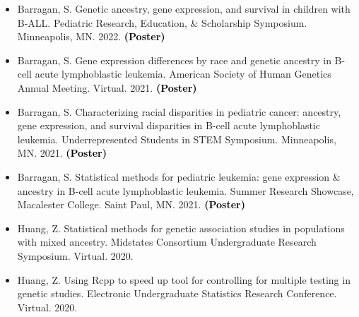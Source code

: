 \documentclass[margin]{res}
\newcommand{\annotate}[1]{\textcolor{black}{\textbf{(#1)}}}
\begin{document}
\begin{resume}
\begin{itemize}


\item[7.] Barragan, S.  
Genetic ancestry, gene expression, and survival in children with B-ALL. 
Pediatric Research, Education, \& Scholarship Symposium. Minneapolis, MN. 2022. 
\annotate{Poster}


\item[6.] Barragan, S.  
Gene expression differences by race and genetic ancestry in B-cell acute lymphoblastic leukemia. 
American Society of Human Genetics Annual Meeting. Virtual. 2021. 
\annotate{Poster}

\item[5.] Barragan, S.  
Characterizing racial disparities in pediatric cancer: ancestry, gene expression, and survival disparities in B-cell acute lymphoblastic leukemia. 
Underrepresented Students in STEM Symposium. Minneapolis, MN. 2021. 
\annotate{Poster}

\item[4.] Barragan, S.  
Statistical methods for pediatric leukemia: gene expression \& ancestry in B-cell acute lymphoblastic leukemia. 
Summer Research Showcase, Macalester College. Saint Paul, MN. 2021. 
\annotate{Poster}


\item[3.] Huang, Z. 
Statistical methods for genetic association studies in populations with mixed ancestry. 
Midstates Consortium Undergraduate Research Symposium. Virtual. 2020.

\item[2.] Huang, Z. 
Using Rcpp to speed up tool for controlling for multiple testing in genetic studies. 
Electronic Undergraduate Statistics Research Conference. Virtual. 2020.


\end{itemize}
\end{resume}
\end{document}
